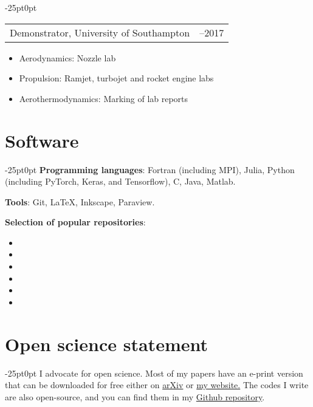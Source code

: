 \documentclass[line]{res}
\newenvironment{p11}
{\begin{adjustwidth}{-25pt}{0pt}
\vspace{8pt}}
{\end{adjustwidth}}
\begin{document}
\begin{resume}
\begin{p11}
\begin{tabular}{p{} >{\raggedleft\arraybackslash}p{}}
	Demonstrator, University of Southampton & 2015--2017 \\
\end{tabular}
\begin{itemize}
	\item Aerodynamics: Nozzle lab
	\item Propulsion: Ramjet, turbojet and rocket engine labs
	\item Aerothermodynamics: Marking of lab reports
\end{itemize}
\end{p11}

\section{Software}
\begin{p11}
\textbf{Programming languages}: Fortran (including MPI), Julia, Python (including PyTorch, Keras, and Tensorflow), C, Java, Matlab.

\vspace{4pt}
\textbf{Tools}: Git, \LaTeX, Inkscape, Paraview.

\vspace{4pt}
\textbf{Selection of popular repositories}:
\begin{itemize}
	\item {}
	\item {}
	\item {}
	\item {}
	\item {}
	\item {}
\end{itemize}
\end{p11}

\section{Open science statement}
\begin{p11}\setlength{\parskip}{3pt}
I advocate for open science.
Most of my papers have an e-print version that can be downloaded for free either on \href{https://arxiv.org/search/physics?searchtype=author&query=Font%2C+B}{arXiv} or \href{https://b-fg.github.io/}{my website.}
The codes I write are also open-source, and you can find them in my \href{https://github.com/b-fg}{Github repository}.
\end{p11}

\end{resume}
\end{document}
